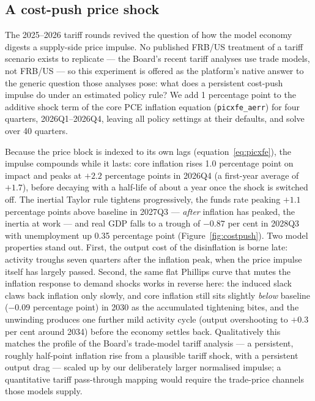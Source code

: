 \subsection{A cost-push price shock}
\label{sec:costpush}

The 2025--2026 tariff rounds revived the question of how the model economy digests a supply-side price impulse. No published FRB/US treatment of a tariff scenario exists to replicate --- the Board's recent tariff analyses use trade models, not FRB/US \citep{cubaborda2025trade} --- so this experiment is offered as the platform's native answer to the generic question those analyses pose: what does a persistent cost-push impulse do under an estimated policy rule? We add 1 percentage point to the additive shock term of the core PCE inflation equation (\texttt{picxfe\_aerr}) for four quarters, 2026Q1--2026Q4, leaving all policy settings at their defaults, and solve over 40 quarters.

Because the price block is indexed to its own lags (equation~\ref{eq:picxfe}), the impulse compounds while it lasts: core inflation rises 1.0 percentage point on impact and peaks at $+2.2$ percentage points in 2026Q4 (a first-year average of $+1.7$), before decaying with a half-life of about a year once the shock is switched off. The inertial Taylor rule tightens progressively, the funds rate peaking $+1.1$ percentage points above baseline in 2027Q3 --- \emph{after} inflation has peaked, the inertia at work --- and real GDP falls to a trough of $-0.87$ per cent in 2028Q3 with unemployment up 0.35 percentage point (Figure~\ref{fig:costpush}). Two model properties stand out. First, the output cost of the disinflation is borne late: activity troughs seven quarters after the inflation peak, when the price impulse itself has largely passed. Second, the same flat Phillips curve that mutes the inflation response to demand shocks works in reverse here: the induced slack claws back inflation only slowly, and core inflation still sits slightly \emph{below} baseline ($-0.09$ percentage point) in 2030 as the accumulated tightening bites, and the unwinding produces one further mild activity cycle (output overshooting to $+0.3$ per cent around 2034) before the economy settles back. Qualitatively this matches the profile of the Board's trade-model tariff analysis --- a persistent, roughly half-point inflation rise from a plausible tariff shock, with a persistent output drag \citep{cubaborda2025trade} --- scaled up by our deliberately larger normalised impulse; a quantitative tariff pass-through mapping would require the trade-price channels those models supply.

